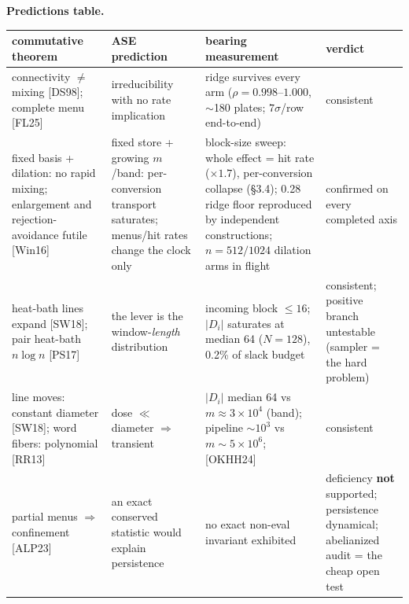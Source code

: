 \documentclass[11pt]{article}
\newcommand{\Di}{\lvert D_i\rvert}
\begin{document}
\textbf{Predictions table.}
\begin{center}\footnotesize\setlength{\tabcolsep}{4pt}
\begin{tabular}{p{3.7cm}p{4.4cm}p{5.1cm}p{2.2cm}}
\toprule
\textbf{commutative theorem} & \textbf{ASE prediction} & \textbf{bearing measurement} & \textbf{verdict} \\
\midrule
connectivity $\ne$ mixing [DS98]; complete menu [FL25] & irreducibility with no rate implication & ridge survives every arm ($\rho=0.998$--$1.000$, $\sim$180 plates; $7\sigma$/row end-to-end) & consistent \\
fixed basis + dilation: no rapid mixing; enlargement and rejection-avoidance futile [Win16] & fixed store + growing $m$/band: per-conversion transport saturates; menus/hit rates change the clock only & block-size sweep: whole effect = hit rate ($\times1.7$), per-conversion collapse (\S3.4); 0.28 ridge floor reproduced by independent constructions; $n{=}512/1024$ dilation arms in flight & confirmed on every completed axis \\
heat-bath lines expand [SW18]; pair heat-bath $n\log n$ [PS17] & the lever is the window-\emph{length} distribution & incoming block $\le16$; $\Di$ saturates at median 64 ($N{=}128$), 0.2\% of slack budget & consistent; positive branch untestable (sampler = the hard problem) \\
line moves: constant diameter [SW18]; word fibers: polynomial [RR13] & dose $\ll$ diameter $\Rightarrow$ transient & $\Di$ median 64 vs $m{\approx}3{\times}10^4$ (band); pipeline $\sim10^3$ vs $m{\sim}5{\times}10^6$; [OKHH24] & consistent \\
partial menus $\Rightarrow$ confinement [ALP23] & an exact conserved statistic would explain persistence & no exact non-eval invariant exhibited & deficiency \textbf{not} supported; persistence dynamical; abelianized audit = the cheap open test \\
\bottomrule
\end{tabular}
\end{center}
\end{document}
